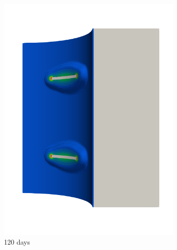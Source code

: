 \begin{figure}[!htb]
\begin{subfigure}[b]{0.2\textwidth}
    \includegraphics[width=\textwidth]{Chapter5/figures/spallation/seed_ep_3}
    \caption{120 days}
  \end{subfigure}
  \begin{subfigure}[b]{0.2\textwidth}
    \centering

\end{subfigure}
\end{figure}
